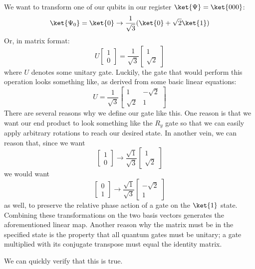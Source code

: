 \documentclass[12pt]{article}
\begin{document}
We want to transform one of our qubits in our register $\ket{\Psi} = \ket{000}$: $$\ket{\Psi_0} = \ket{0} \to \frac{1}{\sqrt{3}} (\ket{0} + \sqrt{2} \ket{1})$$
Or, in matrix format:
$$U\begin{bmatrix} 1 \\ 0 \end{bmatrix} = \frac{1}{\sqrt{3}}\begin{bmatrix} 1 \\ \sqrt{2} \end{bmatrix}$$
where $U$ denotes some unitary gate. 
Luckily, the gate that would perform this operation looks something like, as derived from some basic linear equations: 
$$U = \frac{1}{\sqrt{3}}\begin{bmatrix} 1 & -\sqrt{2} \\ \sqrt{2} & 1 \end{bmatrix}$$
There are several reasons why we define our gate like this. One reason is that we want our end product to look something like the $R_y$ gate so that we can easily apply arbitrary rotations to reach our desired state. In another vein, we can reason that, since we want $$\begin{bmatrix} 1 \\ 0 \end{bmatrix} \to \frac{\sqrt{1}}{\sqrt{3}} \begin{bmatrix} 1 \\ \sqrt{2} \end{bmatrix}$$ we would want $$\begin{bmatrix} 0 \\ 1 \end{bmatrix} \to \frac{\sqrt{1}}{\sqrt{3}} \begin{bmatrix} -\sqrt{2} \\ 1 \end{bmatrix}$$ as well, to preserve the relative phase action of a gate on the $\ket{1}$ state. Combining these transformations on the two basis vectors generates the aforementioned linear map. Another reason why the matrix must be in the specified state is the property that all quantum gates must be unitary; a gate multiplied with its conjugate transpose must equal the identity matrix.

We can quickly verify that this is true.
\end{document}
